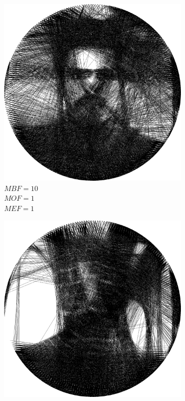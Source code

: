 \begin{figure}[H]
\begin{subfigure}{0.32\textwidth}
        \includegraphics[width = \textwidth]{img/4-mine/taco-thread/taco_e_i3000_c20_inv0_bg10_obj1_ed1.png}
        \caption{\(MBF = 10\) \\ \(MOF = 1\) \\ \(MEF = 1\)}
        \label{mine-param-taco-thread-d}
    \end{subfigure}
    \begin{subfigure}{0.32\textwidth}
        \centering
        \includegraphics[width = \textwidth]{img/4-mine/taco-thread/taco_e_i3000_c20_inv0_bg1_obj10_ed1.png}

\end{subfigure}
\end{figure}
